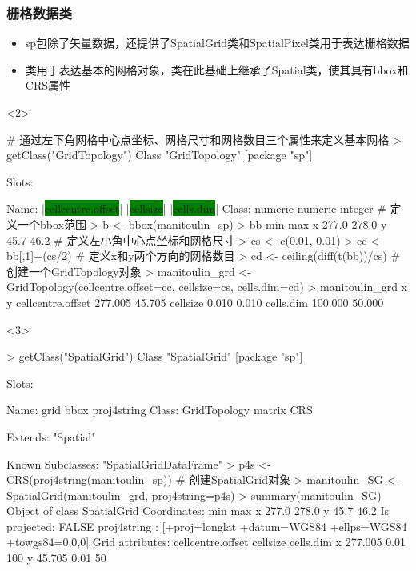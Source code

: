 \subsubsection{栅格数据类}
\begin{frame}[t,fragile]{\subsecname}{\subsubsecname}
\begin{itemize}
\item<1-> sp包除了矢量数据，还提供了SpatialGrid类和SpatialPixel类用于表达栅格数据
\item<2-> 类用于表达基本的网格对象，类在此基础上继承了Spatial类，使其具有bbox和CRS属性
\end{itemize}

\begin{overlayarea}{\textwidth}{\textheight}
\begin{onlyenv}<2>
\begin{rcode}
# 通过左下角网格中心点坐标、网格尺寸和网格数目三个属性来定义基本网格
> getClass("GridTopology")
Class "GridTopology" [package "sp"]

Slots:
                                                            
Name:  |\colorbox{green}{cellcentre.offset}|          |\colorbox{green}{cellsize}|         |\colorbox{green}{cells.dim}|
Class:           numeric           numeric           integer
# 定义一个bbox范围
> b <- bbox(manitoulin_sp)
> bb
    min   max
x 277.0 278.0
y  45.7  46.2
# 定义左小角中心点坐标和网格尺寸
> cs <- c(0.01, 0.01)
> cc <- bb[,1]+(cs/2)
# 定义x和y两个方向的网格数目
> cd <- ceiling(diff(t(bb))/cs)
# 创建一个GridTopology对象
> manitoulin_grd <- GridTopology(cellcentre.offset=cc, cellsize=cs, cells.dim=cd)
> manitoulin_grd
                        x      y
cellcentre.offset 277.005 45.705
cellsize            0.010  0.010
cells.dim         100.000 50.000
\end{rcode}
\end{onlyenv}

\begin{onlyenv}<3>
\begin{rcode}
> getClass("SpatialGrid")
Class "SpatialGrid" [package "sp"]

Slots:
                                             
Name:          grid         bbox  proj4string
Class: GridTopology       matrix          CRS

Extends: "Spatial"

Known Subclasses: "SpatialGridDataFrame"
> p4s <- CRS(proj4string(manitoulin_sp))
# 创建SpatialGrid对象
> manitoulin_SG <- SpatialGrid(manitoulin_grd, proj4string=p4s)
> summary(manitoulin_SG)
Object of class SpatialGrid
Coordinates:
    min   max
x 277.0 278.0
y  45.7  46.2
Is projected: FALSE 
proj4string :
[+proj=longlat +datum=WGS84 +ellps=WGS84 +towgs84=0,0,0]
Grid attributes:
  cellcentre.offset cellsize cells.dim
x           277.005     0.01       100
y            45.705     0.01        50
\end{rcode}
\end{onlyenv}


\end{overlayarea}
\end{frame}
